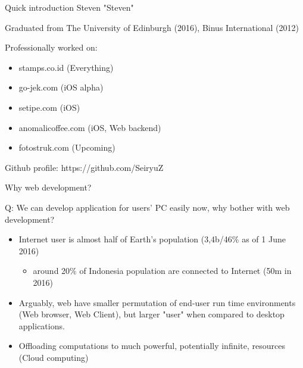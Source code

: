 \documentclass{beamer}
\begin{document}
  \begin{frame}{Quick introduction}
	Steven "Steven"
	
	Graduated from The University of Edinburgh (2016), Binus International (2012)
	
	Professionally worked on:
	\begin{itemize}
		\item stamps.co.id  (Everything)
		\item go-jek.com (iOS alpha)
		\item setipe.com  (iOS)
		\item anomalicoffee.com (iOS, Web backend)
		\item fotostruk.com (Upcoming)
	\end{itemize}
	
	Github profile: https://github.com/SeiryuZ
  \end{frame}
  \begin{frame}{Why web development?}

	Q: We can develop application for users' PC easily now, why bother with web development?

	\pause
	\begin{itemize}[<+->]
	
		\item Internet user is almost half of Earth's population (3,4b/46\% as of 1 June 2016)\footnotemark[1]
			\begin{itemize}[<+->]
				\item around 20\% of Indonesia population are connected to Internet (50m in 2016\footnotemark[1])
			\end{itemize}
			
		\item Arguably, web have smaller permutation of end-user run time environments (Web browser, Web Client), but larger "user" when compared to desktop applications.
		
		\item Offloading computations to much powerful, potentially infinite, resources (Cloud computing)
		
	\end{itemize}


  \end{frame}
  
\end{document}
